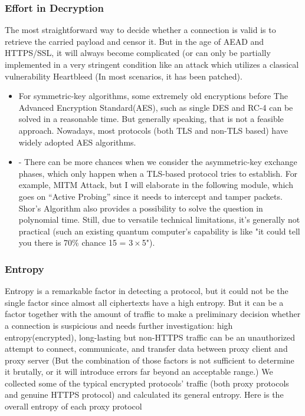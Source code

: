 \documentclass[conference]{IEEEtran}
\begin{document}
\subsubsection{Effort in Decryption}
 The most straightforward way to decide whether a connection is valid is to retrieve the carried payload and censor it. But in the age of AEAD and HTTPS/SSL, it will always become complicated (or can only be partially implemented in a very stringent condition like an attack which utilizes a classical vulnerability Heartbleed \cite{Heartbleed} (In most scenarios, it has been patched).
 \begin{itemize}
    \item  For symmetric-key algorithms, some extremely old encryptions before The Advanced Encryption Standard(AES), such as single DES and RC-4 can be solved in a reasonable time. But generally speaking, that is not a feasible approach. Nowadays, most protocols (both TLS and non-TLS based) have widely adopted AES algorithms.
    \item - There can be more chances when we consider the asymmetric-key exchange phases, which only happen when a TLS-based protocol tries to establish. For example, MITM Attack, but I will elaborate in the following module, which goes on “Active Probing” since it needs to intercept and tamper packets. Shor’s Algorithm \cite{Shors_Algorithm} also provides a possibility to solve the question in polynomial time. Still, due to versatile technical limitations, it’s generally not practical (such an existing quantum computer’s capability is like "it could tell you there is 70\% chance 15 = $3\times$5").
 \end{itemize}

\subsubsection{Entropy}
Entropy is a remarkable factor in detecting a protocol, but it could not be the single factor since almost all ciphertexts have a high entropy. But it can be a factor together with the amount of traffic to make a preliminary decision whether a connection is suspicious and needs further investigation: high entropy(encrypted), long-lasting but non-HTTPS traffic can be an unauthorized attempt to connect, communicate, and transfer data between proxy client and proxy server (But the combination of those factors is not sufficient to determine it brutally, or it will introduce errors far beyond an acceptable range.)
We collected some of the typical encrypted protocols' traffic (both proxy protocols and genuine HTTPS protocol) and calculated its general entropy.
Here is the overall entropy of each proxy protocol
\end{document}
